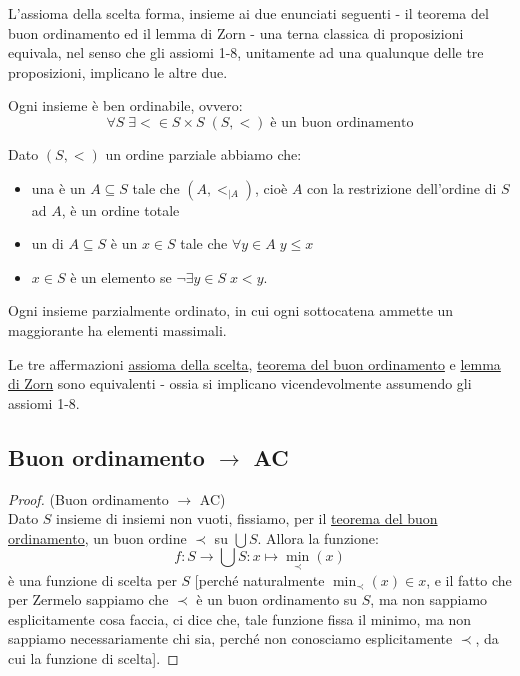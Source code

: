 \documentclass[11pt]{scrartcl}
\begin{document}
L'assioma della scelta forma, insieme ai due enunciati seguenti - il teorema del buon ordinamento ed il lemma di Zorn - una terna classica di proposizioni equivala, nel senso che gli assiomi 1-8, unitamente ad una qualunque delle tre proposizioni, implicano le altre due.

\begin{theorem}
	\label{buon_ordinamento}
	Ogni insieme è ben ordinabile, ovvero:
	\[ \forall S \; \exists < \in S \times S \; (S,<)\;\text{è un buon ordinamento}
		\]
\end{theorem}

\begin{definition}
	Dato $(S,<)$ un ordine parziale abbiamo che:
	\begin{itemize}
		\item una  è un $A \subseteq S$ tale che $(A,<_{|A})$, cioè $A$ con la restrizione dell'ordine di $S$ ad $A$, è un ordine totale
		\item un  di $A \subseteq S$ è un $x \in S$ tale che $\forall y \in A \; y \leq x$
		\item $x \in S$ è un elemento  se $\neg \exists y \in S \; x < y$.
	\end{itemize}
\end{definition}

\begin{lemma}
	\label{Zorn}
	Ogni insieme parzialmente ordinato, in cui ogni sottocatena ammette un maggiorante ha elementi massimali.
\end{lemma}

\begin{theorem}
	Le tre affermazioni \hyperref[ax9]{assioma della scelta}, \hyperref[buon_ordinamento]{teorema del buon ordinamento} e \hyperref[Zorn]{lemma di Zorn} sono equivalenti -
	ossia si implicano vicendevolmente assumendo gli assiomi 1-8.
\end{theorem}

\subsection{\texorpdfstring{Buon ordinamento $\rightarrow$ AC}{Buon ordinamento implica AC}}

\begin{proof}
	(Buon ordinamento $\rightarrow$ AC)\\
	Dato $S$ insieme di insiemi non vuoti, fissiamo, per il \hyperref[buon_ordinamento]{teorema del buon ordinamento}, un buon ordine $\prec$ su $\bigcup S$. Allora la funzione:
	\[ f : S \rightarrow \bigcup S : x \mapsto \min_{\prec}(x)
		\]
	è una funzione di scelta per $S$ [perché naturalmente $\min_\prec (x) \in x$, e il fatto che per Zermelo sappiamo che $\prec$ è un buon ordinamento su $S$, ma non sappiamo esplicitamente cosa faccia, ci dice che, tale funzione fissa il minimo, ma non sappiamo necessariamente chi sia, perché non 
	conosciamo esplicitamente $\prec$, da cui la funzione di scelta].
\end{proof}
\end{document}
